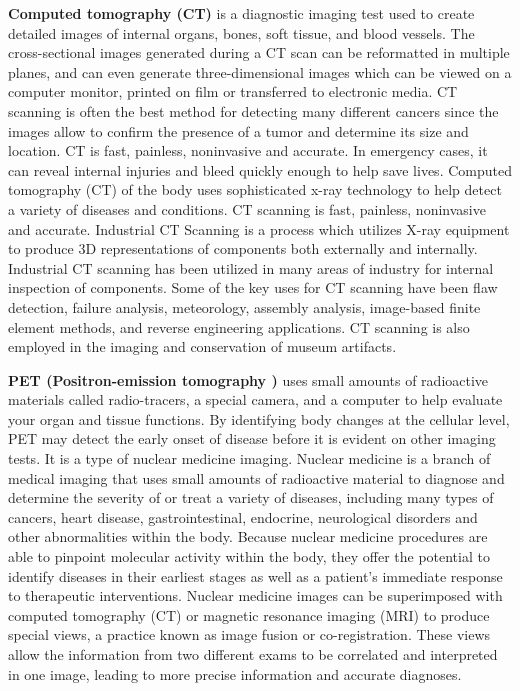 \textbf{  Computed tomography (CT) } is a diagnostic imaging test used to create detailed images of internal organs, bones, soft tissue, and blood vessels. The cross-sectional images generated during a CT scan can be reformatted in multiple planes, and can even generate three-dimensional images which can be viewed on a computer monitor, printed on film or transferred to electronic media. CT scanning is often the best method for detecting many different cancers since the images allow to confirm the presence of a tumor and determine its size and location. CT is fast, painless, noninvasive and accurate. In emergency cases, it can reveal internal injuries and bleed quickly enough to help save lives. \newline Computed tomography (CT) of the body uses sophisticated x-ray technology to help detect a variety of diseases and conditions. CT scanning is fast, painless, noninvasive and accurate.  Industrial CT Scanning is a process which utilizes X-ray equipment to produce 3D representations of components both externally and internally. Industrial CT scanning has been utilized in many areas of industry for internal inspection of components. Some of the key uses for CT scanning have been flaw detection, failure analysis, meteorology, assembly analysis, image-based finite element methods, and reverse engineering applications. CT scanning is also employed in the imaging and conservation of museum artifacts.


 \textbf{PET (Positron-emission tomography ) } uses small amounts of radioactive materials called radio-tracers, a special camera, and a computer to help evaluate your organ and tissue functions. By identifying body changes at the cellular level, PET may detect the early onset of disease before it is evident on other imaging tests. It is a type of nuclear medicine imaging. Nuclear medicine is a branch of medical imaging that uses small amounts of radioactive material to diagnose and determine the severity of or treat a variety of diseases, including many types of cancers, heart disease, gastrointestinal, endocrine, neurological disorders and other abnormalities within the body. Because nuclear medicine procedures are able to pinpoint molecular activity within the body, they offer the potential to identify diseases in their earliest stages as well as a patient's immediate response to therapeutic interventions. Nuclear medicine images can be superimposed with computed tomography (CT) or magnetic resonance imaging (MRI) to produce special views, a practice known as image fusion or co-registration. These views allow the information from two different exams to be correlated and interpreted in one image, leading to more precise information and accurate diagnoses.


